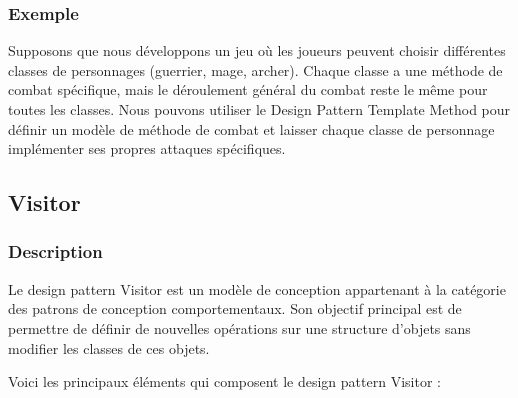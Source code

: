 \subsubsection{Exemple}

Supposons que nous développons un jeu où les joueurs peuvent choisir différentes classes de personnages (guerrier, mage, archer). Chaque classe a une méthode de combat spécifique, mais le déroulement général du combat reste le même pour toutes les classes. Nous pouvons utiliser le Design Pattern Template Method pour définir un modèle de méthode de combat et laisser chaque classe de personnage implémenter ses propres attaques spécifiques.





\newpage

\subsection{Visitor}

\subsubsection{Description}

Le design pattern Visitor est un modèle de conception appartenant à la catégorie des patrons de conception comportementaux. Son objectif principal est de permettre de définir de nouvelles opérations sur une structure d'objets sans modifier les classes de ces objets.

Voici les principaux éléments qui composent le design pattern Visitor :

